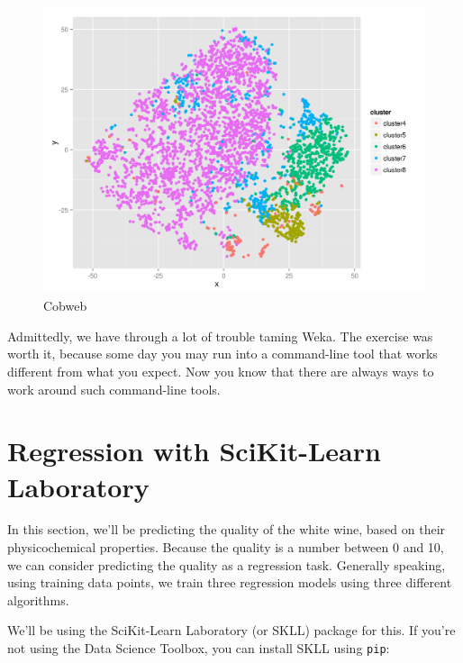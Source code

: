 \documentclass[
]{book}
\newenvironment{Shaded}{\begin{snugshade}}{\end{snugshade}}
\newcommand{\ExtensionTok}[1]{#1}
\newcommand{\NormalTok}[1]{#1}
\theoremstyle{definition}
\theoremstyle{definition}
\theoremstyle{definition}
\theoremstyle{remark}
\begin{document}
\begin{figure}

{\centering \includegraphics[width=32.81in]{images/ch09-wine-cluster-cobweb} 

}

\caption{Cobweb}\label{fig:unnamed-chunk-35}
\end{figure}

Admittedly, we have through a lot of trouble taming Weka. The exercise was worth it, because some day you may run into a command-line tool that works different from what you expect. Now you know that there are always ways to work around such command-line tools.

\hypertarget{regression-with-scikit-learn-laboratory}{%
\section{Regression with SciKit-Learn Laboratory}\label{regression-with-scikit-learn-laboratory}}

In this section, we'll be predicting the quality of the white wine, based on their physicochemical properties. Because the quality is a number between 0 and 10, we can consider predicting the quality as a regression task. Generally speaking, using training data points, we train three regression models using three different algorithms.

We'll be using the SciKit-Learn Laboratory (or SKLL) package for this. If you're not using the Data Science Toolbox, you can install SKLL using \texttt{pip}:

\begin{Shaded}
\end{Shaded}
\end{document}
